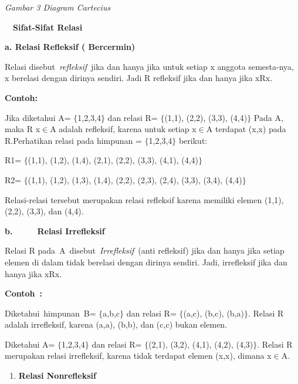 \documentclass[11pt,fleqn]{book} %
\begin{document}
\noindent \textit{Gambar 3 Diagram Cartecius}

\noindent 

\noindent 

 ~~\textbf{Sifat-Sifat Relasi}

\textbf{a. Relasi Refleksif ( Bercermin)}

\textbf{}

Relasi disebut~\textit{refleksif}~jika dan hanya jika untuk setiap x anggota semesta-nya, x berelasi dengan dirinya sendiri. Jadi R refleksif jika dan hanya jika xRx.

\textbf{}

\textbf{Contoh:}



\noindent Jika diketahui A= $\{$1,2,3,4$\}$ dan relasi R= $\{$(1,1), (2,2), (3,3), (4,4)$\}$ Pada A, maka R x$\mathrm{\in }$A adalah refleksif, karena untuk setiap x$\mathrm{\in }$A terdapat (x,x) pada R.Perhatikan relasi pada himpunan = $\{$1,2,3,4$\}$ berikut:



R1= $\{$(1,1), (1,2), (1,4), (2,1), (2,2), (3,3), (4,1), (4,4)$\}$

R2= $\{$(1,1), (1,2), (1,3), (1,4), (2,2), (2,3), (2,4), (3,3), (3,4), (4,4)$\}$



\noindent Relasi-relasi tersebut merupakan relasi refleksif karena memiliki elemen (1,1), (2,2), (3,3), dan (4,4).



\textbf{b.}~~~~~~\textbf{Relasi Irrefleksif}

\textbf{}

Relasi R pada~A~disebut~\textit{Irrefleksif}~(anti refleksif) jika dan hanya jika setiap elemen di dalam tidak berelasi dengan dirinya sendiri. Jadi, irrefleksif jika dan hanya jika xRx.

\textbf{Contoh~:}

\noindent 

\noindent Diketahui~himpunan~B= $\{$a,b,c$\}$ dan relasi R= $\{$(a,c), (b,c), (b,a)$\}$. Relasi R adalah irrefleksif, karena (a,a), (b,b), dan (c,c) bukan elemen.

\noindent 

\noindent Diketahui A= $\{$1,2,3,4$\}$ dan relasi R= $\{$(2,1), (3,2), (4,1), (4,2), (4,3)$\}$. Relasi R merupakan relasi irrefleksif, karena tidak terdapat elemen (x,x), dimana x$\mathrm{\in }$A.



\begin{enumerate}
\item  \textbf{Relasi Nonrefleksif}
\end{enumerate}
\end{document}
